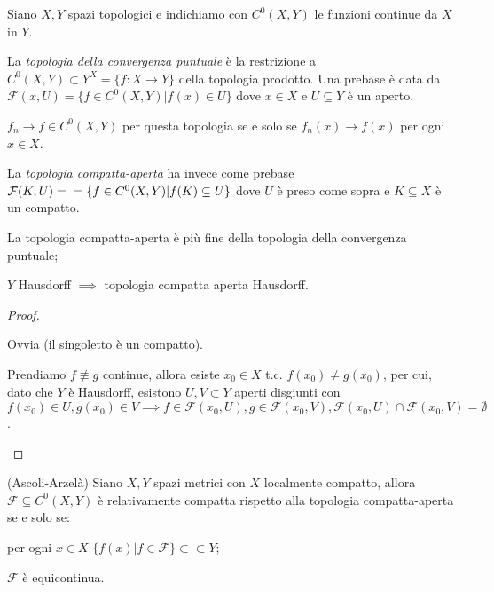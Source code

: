 Siano $X, Y$ spazi topologici e indichiamo con $C^0(X, Y)$ le funzioni continue da $X$ in $Y$.

La \textit{topologia della convergenza puntuale} è la restrizione a $C^0(X, Y) \subset Y^X=\{f:X \longrightarrow Y\}$ della topologia prodotto. Una prebase è data da $\mathcal{F}(x, U)=\{f \in C^0(X, Y) |f(x) \in U\}$ dove $x \in X$ e $U \subseteq Y$ è un aperto.

\begin{exc}
  $f_n \longrightarrow f \in C^0(X, Y)$ per questa topologia se e solo se $f_n(x) \longrightarrow f(x)$ per ogni $x \in X$.
\end{exc}

La \textit{topologia compatta-aperta} ha invece come prebase $\mathcal{F}(K, U)= \\ =\{f \in C^0(X, Y) | f(K) \subseteq U\}$ dove $U$ è preso come sopra e $K \subseteq X$ è un compatto.

\begin{prop}
  \begin{nlist}
    \item La topologia compatta-aperta è più fine della topologia della convergenza puntuale;
    \item $Y$ Hausdorff $\implies$ topologia compatta aperta Hausdorff.
  \end{nlist}
\end{prop}

\begin{proof}
  \begin{nlist}
    \item Ovvia (il singoletto è un compatto).
    \item Prendiamo $f \not\equiv g$ continue, allora esiste $x_0 \in X$ t.c. $f(x_0) \not= g(x_0)$, per cui, dato che $Y$ è Hausdorff,
    esistono $U, V \subset Y$ aperti disgiunti con $f(x_0) \in U, g(x_0) \in V \implies f \in \mathcal{F}(x_0, U), g \in \mathcal{F}(x_0, V), \mathcal{F}(x_0, U) \cap \mathcal{F}(x_0, V)=\emptyset$.
  \end{nlist}
\end{proof}

\begin{thm}
  (Ascoli-Arzelà) Siano $X, Y$ spazi metrici con $X$ localmente compatto, allora $\mathcal{F} \subseteq C^0(X, Y)$ è relativamente compatta rispetto alla topologia compatta-aperta se e solo se:
  \begin{nlist}
    \item per ogni $x \in X$ $\{f(x) | f \in \mathcal{F}\} \subset \subset Y$;
    \item $\mathcal{F}$ è equicontinua.
  \end{nlist}
\end{thm}

